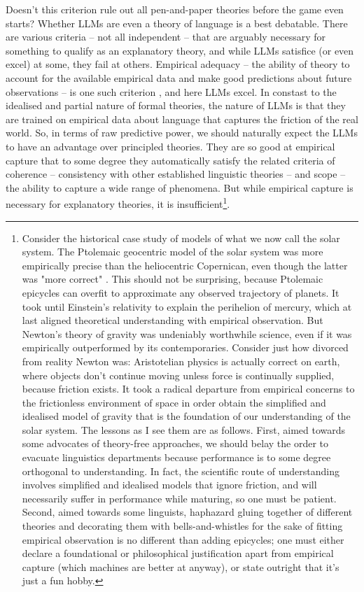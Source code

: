 Doesn't this criterion rule out all pen-and-paper theories before the game even starts? Whether LLMs are even a theory of language is a best debatable. There are various criteria -- not all independent -- that are arguably necessary for something to qualify as an explanatory theory, and while LLMs satisfice (or even excel) at some, they fail at others. Empirical adequacy -- the ability of theory to account for the available empirical data and make good predictions about future observations -- is one such criterion \citep{}, and here LLMs excel. In constast to the idealised and partial nature of formal theories, the nature of LLMs is that they are trained on empirical data about language that captures the friction of the real world. So, in terms of raw predictive power, we should naturally expect the LLMs to have an advantage over principled theories. They are so good at empirical capture that to some degree they automatically satisfy the related criteria of coherence -- consistency with other established linguistic theories -- and scope -- the ability to capture a wide range of phenomena. But while empirical capture is necessary for explanatory theories, it is insufficient\footnote{Consider the historical case study of models of what we now call the solar system. The Ptolemaic geocentric model of the solar system was more empirically precise than the heliocentric Copernican, even though the latter was "more correct" \citep{}. This should not be surprising, because Ptolemaic epicycles can overfit to approximate any observed trajectory of planets. It took until Einstein's relativity to explain the perihelion of mercury, which at last aligned theoretical understanding with empirical observation. But Newton's theory of gravity was undeniably worthwhile science, even if it was empirically outperformed by its contemporaries. Consider just how divorced from reality Newton was: Aristotelian physics is actually correct on earth, where objects don't continue moving unless force is continually supplied, because friction exists. It took a radical departure from empirical concerns to the frictionless environment of space in order obtain the simplified and idealised model of gravity that is the foundation of our understanding of the solar system. The lessons as I see them are as follows. First, aimed towards some advocates of theory-free approaches, we should belay the order to evacuate linguistics departments because performance is to some degree orthogonal to understanding. In fact, the scientific route of understanding involves simplified and idealised models that ignore friction, and will necessarily suffer in performance while maturing, so one must be patient. Second, aimed towards some linguists, haphazard gluing together of different theories and decorating them with bells-and-whistles for the sake of fitting empirical observation is no different than adding epicycles; one must either declare a foundational or philosophical justification apart from empirical capture (which machines are better at anyway), or state outright that it's just a fun hobby.}.\\

